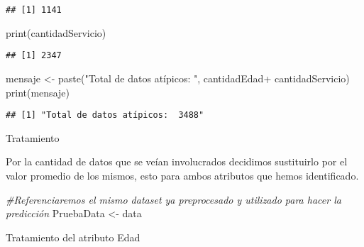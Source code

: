 \documentclass[
]{article}
\newenvironment{Shaded}{\begin{snugshade}}{\end{snugshade}}
\newcommand{\CommentTok}[1]{\textcolor[rgb]{0.56,0.35,0.01}{\textit{#1}}}
\newcommand{\FunctionTok}[1]{\textcolor[rgb]{0.00,0.00,0.00}{#1}}
\newcommand{\NormalTok}[1]{#1}
\newcommand{\OtherTok}[1]{\textcolor[rgb]{0.56,0.35,0.01}{#1}}
\newcommand{\SpecialCharTok}[1]{\textcolor[rgb]{0.00,0.00,0.00}{#1}}
\newcommand{\StringTok}[1]{\textcolor[rgb]{0.31,0.60,0.02}{#1}}
\begin{document}
\begin{verbatim}
## [1] 1141
\end{verbatim}

\begin{Shaded}
\begin{Highlighting}[]
\FunctionTok{print}\NormalTok{(cantidadServicio)}
\end{Highlighting}
\end{Shaded}

\begin{verbatim}
## [1] 2347
\end{verbatim}

\begin{Shaded}
\begin{Highlighting}[]
\NormalTok{mensaje }\OtherTok{\textless{}{-}} \FunctionTok{paste}\NormalTok{(}\StringTok{"Total de datos atípicos: "}\NormalTok{, cantidadEdad}\SpecialCharTok{+}\NormalTok{ cantidadServicio)}
\FunctionTok{print}\NormalTok{(mensaje)}
\end{Highlighting}
\end{Shaded}

\begin{verbatim}
## [1] "Total de datos atípicos:  3488"
\end{verbatim}

Tratamiento

Por la cantidad de datos que se veían involucrados decidimos sustituirlo
por el valor promedio de los mismos, esto para ambos atributos que hemos
identificado.

\begin{Shaded}
\begin{Highlighting}[]
\CommentTok{\#Referenciaremos el mismo dataset ya preprocesado y utilizado para hacer la predicción}
\NormalTok{PruebaData }\OtherTok{\textless{}{-}}\NormalTok{ data}
\end{Highlighting}
\end{Shaded}

Tratamiento del atributo Edad
\end{document}
